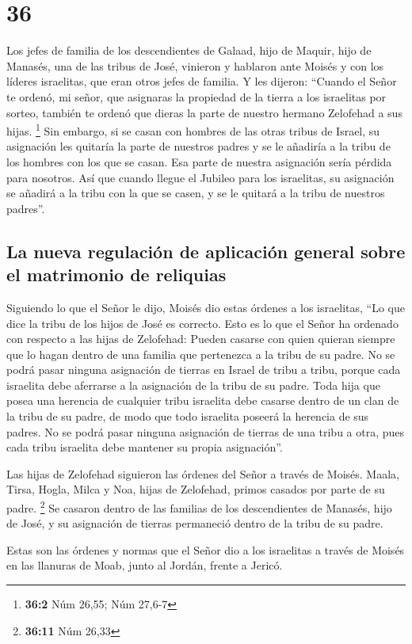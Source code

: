 \hypertarget{section-35}{%
\section{36}\label{section-35}}

 Los jefes de familia de los descendientes de Galaad, hijo
de Maquir, hijo de Manasés, una de las tribus de José, vinieron y
hablaron ante Moisés y con los líderes israelitas, que eran otros jefes
de familia.  Y les dijeron: ``Cuando el Señor te ordenó,
mi señor, que asignaras la propiedad de la tierra a los israelitas por
sorteo, también te ordenó que dieras la parte de nuestro hermano
Zelofehad a sus hijas. \footnote{\textbf{36:2} Núm 26,55; Núm 27,6-7}
 Sin embargo, si se casan con hombres de las otras tribus
de Israel, su asignación les quitaría la parte de nuestros padres y se
le añadiría a la tribu de los hombres con los que se casan. Esa parte de
nuestra asignación sería pérdida para nosotros.  Así que
cuando llegue el Jubileo para los israelitas, su asignación se añadirá a
la tribu con la que se casen, y se le quitará a la tribu de nuestros
padres''.

\hypertarget{la-nueva-regulaciuxf3n-de-aplicaciuxf3n-general-sobre-el-matrimonio-de-reliquias}{%
\subsection{La nueva regulación de aplicación general sobre el
matrimonio de
reliquias}\label{la-nueva-regulaciuxf3n-de-aplicaciuxf3n-general-sobre-el-matrimonio-de-reliquias}}

 Siguiendo lo que el Señor le dijo, Moisés dio estas
órdenes a los israelitas, ``Lo que dice la tribu de los hijos de José es
correcto.  Esto es lo que el Señor ha ordenado con
respecto a las hijas de Zelofehad: Pueden casarse con quien quieran
siempre que lo hagan dentro de una familia que pertenezca a la tribu de
su padre.  No se podrá pasar ninguna asignación de tierras
en Israel de tribu a tribu, porque cada israelita debe aferrarse a la
asignación de la tribu de su padre.  Toda hija que posea
una herencia de cualquier tribu israelita debe casarse dentro de un clan
de la tribu de su padre, de modo que todo israelita poseerá la herencia
de sus padres.  No se podrá pasar ninguna asignación de
tierras de una tribu a otra, pues cada tribu israelita debe mantener su
propia asignación''.

 Las hijas de Zelofehad siguieron las órdenes del Señor a
través de Moisés.  Maala, Tirsa, Hogla, Milca y Noa,
hijas de Zelofehad, primos casados por parte de su padre. \footnote{\textbf{36:11}
  Núm 26,33}  Se casaron dentro de las familias de los
descendientes de Manasés, hijo de José, y su asignación de tierras
permaneció dentro de la tribu de su padre.

 Estas son las órdenes y normas que el Señor dio a los
israelitas a través de Moisés en las llanuras de Moab, junto al Jordán,
frente a Jericó.
